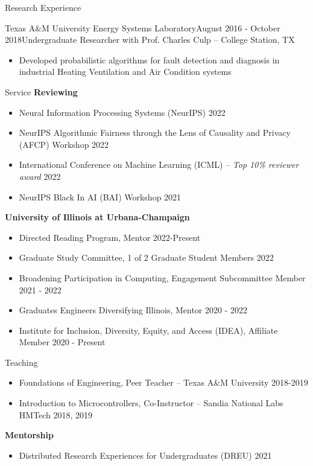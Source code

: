 \documentclass[11pt]{resume} %
\begin{document}
\begin{rSection}{Research Experience}
\begin{rSubsection}{Texas A\&M University Energy Systems Laboratory}{August 2016 - October 2018}{Undergraduate Researcher with Prof. Charles Culp -- College Station, TX}
\begin{itemize}[label={}]
    \setlength\itemsep{0em}
    \item Developed probabilistic algorithms for fault detection and diagnosis in industrial Heating Ventilation and Air Condition systems
\end{itemize}
\end{rSubsection}
\end{rSection}



\begin{rSection}{Service}
\textbf{Reviewing}
\begin{itemize}[label={}]
    \setlength\itemsep{0em}
    \item Neural Information Processing Systems (NeurIPS) \hfill 2022
    \item NeurIPS Algorithmic Fairness through the Lens of Causality and Privacy (AFCP) Workshop \hfill 2022
    \item International Conference on Machine Learning (ICML) -- \textit{Top 10\% reviewer award} \hfill 2022
    \item NeurIPS Black In AI (BAI) Workshop \hfill 2021
\end{itemize}

\textbf{University of Illinois at Urbana-Champaign}
\begin{itemize}[label={}]
    \setlength\itemsep{0em}
    \item Directed Reading Program, Mentor \hfill 2022-Present
    \item Graduate Study Committee, 1 of 2 Graduate Student
    Members \hfill 2022
    \item Broadening Participation in Computing, Engagement Subcommittee Member
    \hfill 2021 - 2022
    \item Graduates Engineers Diversifying Illinois, Mentor \hfill
    2020 - 2022
    \item Institute for Inclusion, Diversity, Equity, and
    Access (IDEA), Affiliate Member \hfill 2020 - Present
\end{itemize}

\begin{rSection}{Teaching}
\begin{itemize}[label={}]
\item Foundations of Engineering, Peer Teacher -- Texas A\&M University \hfill 2018-2019
\item Introduction to Microcontrollers, Co-Instructor -- Sandia National Labs HMTech \hfill 2018, 2019
\end{itemize}
\end{rSection}

\textbf{Mentorship}
\begin{itemize}[label={}]
    \setlength\itemsep{0em}
    \item Distributed Research Experiences for Undergraduates (DREU) \hfill 2021
\end{itemize}
\end{rSection}
\end{document}
